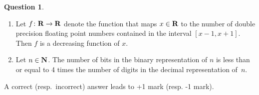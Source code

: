 \documentclass[11pt]{article}
\theoremstyle{definition}
\newtheorem{question}{Question}
\begin{document}
\begin{question}
\begin{enumerate}
        \item
            Let $f\colon \mathbf R \to \mathbf R$ denote the function that maps $x \in \mathbf R$
            to the number of double precision floating point numbers contained in the interval $[x-1, x+1]$.
            Then $f$ is a decreasing function of $x$.

        \item
            Let $n \in \mathbf N$.
            The number of bits in the binary representation of $n$ is less than or equal to 4 times the number of digits in the decimal representation of~$n$.


    \end{enumerate}
    A correct (resp.~incorrect) answer leads to +1 mark (resp. -1 mark).
\end{question}
\end{document}
